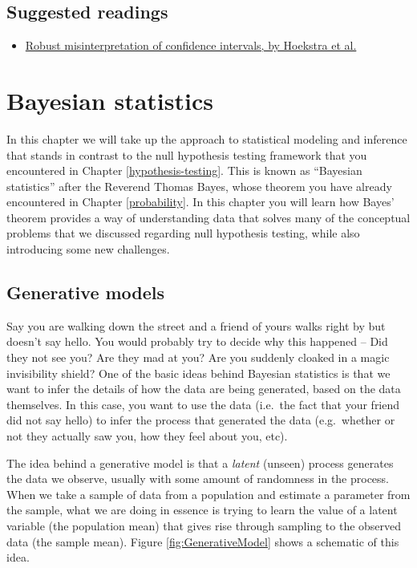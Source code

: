 \documentclass[
  12pt,
]{book}
\providecommand{\tightlist}{%
  \setlength{\itemsep}{0pt}\setlength{\parskip}{0pt}}
\begin{document}
\hypertarget{suggested-readings-7}{%
\section{Suggested readings}\label{suggested-readings-7}}

\begin{itemize}
\tightlist
\item
  \href{http://www.ejwagenmakers.com/inpress/HoekstraEtAlPBR.pdf}{Robust misinterpretation of confidence intervals, by Hoekstra et al.}
\end{itemize}

\hypertarget{bayesian-statistics}{%
\chapter{Bayesian statistics}\label{bayesian-statistics}}

In this chapter we will take up the approach to statistical modeling and inference that stands in contrast to the null hypothesis testing framework that you encountered in Chapter \ref{hypothesis-testing}. This is known as ``Bayesian statistics'' after the Reverend Thomas Bayes, whose theorem you have already encountered in Chapter \ref{probability}. In this chapter you will learn how Bayes' theorem provides a way of understanding data that solves many of the conceptual problems that we discussed regarding null hypothesis testing, while also introducing some new challenges.

\hypertarget{generative-models}{%
\section{Generative models}\label{generative-models}}

Say you are walking down the street and a friend of yours walks right by but doesn't say hello. You would probably try to decide why this happened -- Did they not see you? Are they mad at you? Are you suddenly cloaked in a magic invisibility shield? One of the basic ideas behind Bayesian statistics is that we want to infer the details of how the data are being generated, based on the data themselves. In this case, you want to use the data (i.e.~the fact that your friend did not say hello) to infer the process that generated the data (e.g.~whether or not they actually saw you, how they feel about you, etc).

The idea behind a generative model is that a \emph{latent} (unseen) process generates the data we observe, usually with some amount of randomness in the process. When we take a sample of data from a population and estimate a parameter from the sample, what we are doing in essence is trying to learn the value of a latent variable (the population mean) that gives rise through sampling to the observed data (the sample mean). Figure \ref{fig:GenerativeModel} shows a schematic of this idea.
\end{document}
